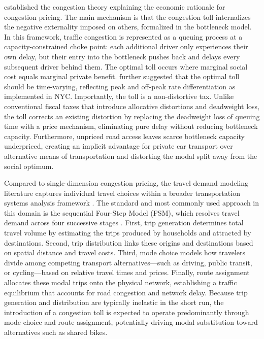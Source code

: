\documentclass[10pt]{article}
\begin{document}
\cite{vickrey1969congestion} established the congestion theory explaining the economic rationale for congestion pricing. The main mechanism is that the congestion toll internalizes the negative externality imposed on others, formalized in the bottleneck model. In this framework, traffic congestion is represented as a queuing process at a capacity-constrained choke point: each additional driver only experiences their own delay, but their entry into the bottleneck pushes back and delays every subsequent driver behind them. The optimal toll occurs where marginal social cost equals marginal private benefit. \cite{vickrey1969congestion} further suggested that the optimal toll should be time-varying, reflecting peak and off-peak rate differentiation as implemented in NYC.
Importantly, the toll is a non-distortive tax. Unlike conventional fiscal taxes that introduce allocative distortions and deadweight loss, the toll corrects an existing distortion by replacing the deadweight loss of queuing time with a price mechanism, eliminating pure delay without reducing bottleneck capacity. Furthermore, unpriced road access leaves scarce bottleneck capacity underpriced, creating an implicit advantage for private car transport over alternative means of transportation and distorting the modal split away from the social optimum.

Compared to single-dimension congestion pricing, the travel demand modeling literature captures individual travel choices within a broader transportation systems analysis framework \parencite{manheim1979fundamentals,mcnally2007four}. The standard and most commonly used approach in this domain is the sequential Four-Step Model (FSM), which resolves travel demand across four successive stages \parencite{mcnally2007four}. First, trip generation determines total travel volume by estimating the trips produced by households and attracted by destinations. Second, trip distribution links these origins and destinations based on spatial distance and travel costs. Third, mode choice models how travelers divide among competing transport alternatives—such as driving, public transit, or cycling—based on relative travel times and prices. Finally, route assignment allocates these modal trips onto the physical network, establishing a traffic equilibrium that accounts for road congestion and network delay. Because trip generation and distribution are typically inelastic in the short run, the introduction of a congestion toll is expected to operate predominantly through mode choice and route assignment, potentially driving modal substitution toward alternatives such as shared bikes.
\end{document}
